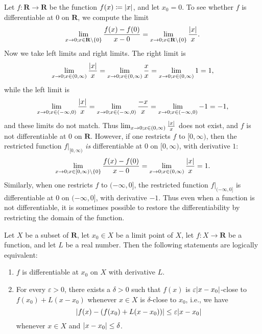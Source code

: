 \begin{example}\label{10.1.6}
    Let \(f : \mathbf{R} \to \mathbf{R}\) be the function \(f(x) \coloneqq \abs*{x}\), and let \(x_0 = 0\).
    To see whether \(f\) is differentiable at \(0\) on \(\mathbf{R}\), we compute the limit
    \[
        \lim_{x \to 0 ; x \in \mathbf{R} \setminus \{0\}} \frac{f(x) - f(0)}{x - 0} = \lim_{x \to 0 ; x \in \mathbf{R} \setminus \{0\}} \frac{\abs*{x}}{x}.
    \]
    Now we take left limits and right limits.
    The right limit is
    \[
        \lim_{x \to 0 ; x \in (0, \infty)} \frac{\abs*{x}}{x} = \lim_{x \to 0 ; x \in (0, \infty)} \frac{x}{x} = \lim_{x \to 0 ; x \in (0, \infty)} 1 = 1,
    \]
    while the left limit is
    \[
        \lim_{x \to 0 ; x \in (-\infty, 0)} \frac{\abs*{x}}{x} = \lim_{x \to 0 ; x \in (-\infty, 0)} \frac{-x}{x} = \lim_{x \to 0 ; x \in (-\infty, 0)} -1 = -1,
    \]
    and these limits do not match.
    Thus \(\lim_{x \to 0 ; x \in (0, \infty)} \frac{\abs*{x}}{x}\) does not exist, and \(f\) is not differentiable at \(0\) on \(\mathbf{R}\).
    However, if one restricts \(f\) to \([0, \infty)\), then the restricted function \(f|_{[0, \infty)}\) \emph{is} differentiable at \(0\) on \([0, \infty)\), with derivative \(1\):
    \[
    \lim_{x \to 0 ; x \in [0, \infty) \setminus \{0\}} \frac{f(x) - f(0)}{x - 0} = \lim_{x \to 0 ; x \in (0, \infty)} \frac{\abs*{x}}{x} = 1.
        \]
        Similarly, when one restricts \(f\) to \((-\infty, 0]\), the restricted function \(f|_{(-\infty, 0]}\) is differentiable at \(0\) on \((-\infty, 0]\), with derivative \(-1\).
    Thus even when a function is not differentiable, it is sometimes possible to restore the differentiability by restricting the domain of the function.
\end{example}

\begin{proposition}\label{10.1.7}
    Let \(X\) be a subset of \(\mathbf{R}\), let \(x_0 \in X\) be a limit point of \(X\), let \(f : X \to \mathbf{R}\) be a function, and let \(L\) be a real number.
    Then the following statements are logically equivalent:
    \begin{enumerate}
        \item \(f\) is differentiable at \(x_0\) on \(X\) with derivative \(L\).
        \item For every \(\varepsilon > 0\), there exists a \(\delta > 0\) such that \(f(x)\) is \(\varepsilon \abs*{x - x_0}\)-close to \(f(x_0) + L(x - x_0)\) whenever \(x \in X\) is \(\delta\)-close to \(x_0\), i.e., we have
              \[
                  \abs*{f(x) - (f(x_0) + L(x - x_0))} \leq \varepsilon \abs*{x - x_0}
              \]
              whenever \(x \in X\) and \(\abs*{x - x_0} \leq \delta\).
    \end{enumerate}
\end{proposition}

